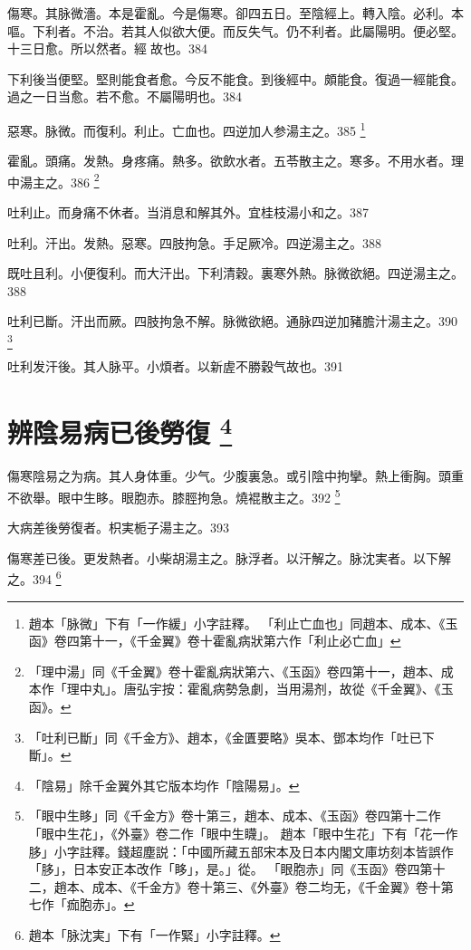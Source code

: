 傷寒。其脉微濇。本是霍亂。今是傷寒。卻四五日。至陰經上。轉入陰。必利。本嘔。下利者。不治。若其人似欲大便。而反失气。仍不利者。此屬陽明。便必堅。十三日愈。所以然者。經{\sungii 𥁞}故也。384

下利後当便堅。堅則能食者愈。今反不能食。到後經中。頗能食。復過一經能食。過之一日当愈。若不愈。不屬陽明也。384

惡寒。脉微。而復利。利止。亡血也。四逆加人参湯主之。385
	\footnote{
		趙本「脉微」下有「一作緩」小字註釋。
		「利止亡血也」同趙本、成本、《玉函》卷四第十一，《千金翼》卷十霍亂病狀第六作「利止必亡血」
	}

霍亂。頭痛。发熱。身疼痛。熱多。欲飲水者。五苓散主之。寒多。不用水者。理中湯主之。386
	\footnote{
		「理中湯」同《千金翼》卷十霍亂病狀第六、《玉函》卷四第十一，趙本、成本作「理中丸」。唐弘宇按：霍亂病勢急劇，当用湯剂，故從《千金翼》、《玉函》。
	}

吐利止。而身痛不休者。当消息和解其外。宜桂枝湯小和之。387

吐利。汗出。发熱。惡寒。四肢拘急。手足厥冷。四逆湯主之。388

既吐且利。小便復利。而大汗出。下利清穀。裏寒外熱。脉微欲絕。四逆湯主之。388

吐利已斷。汗出而厥。四肢拘急不解。脉微欲絕。通脉四逆加豬膽汁湯主之。390
	\footnote{
		「吐利已斷」同《千金方》、趙本，《金匱要略》吳本、鄧本均作「吐已下斷」。
	}

吐利发汗後。其人脉平。小煩者。以新虗不勝穀气故也。391

\chapter{辨陰易病已後勞復
	\footnote{
		「陰易」除千金翼外其它版本均作「陰陽易」。
	}
}

傷寒陰易之为病。其人身体重。少气。少腹裏急。或引陰中拘攣。熱上衝胸。頭重不欲舉。眼中生眵。{\khaai 眼胞赤。}膝脛拘急。燒裩散主之。392
	\footnote{
		「眼中生眵」同《千金方》卷十第三，趙本、成本、《玉函》卷四第十二作「眼中生花」，《外臺》卷二作「眼中生䁾」。
		趙本「眼中生花」下有「花一作䏧」小字註釋。錢超塵説：「中國所藏五部宋本及日本内閣文庫坊刻本皆誤作「䏧」，日本安正本改作「眵」，是。」從。
		「眼胞赤」同《玉函》卷四第十二，趙本、成本、《千金方》卷十第三、《外臺》卷二均无，《千金翼》卷十第七作「痂胞赤」。
	}

大病差後勞復者。枳実栀子湯主之。393

傷寒差已後。更发熱者。小柴胡湯主之。脉浮者。以汗解之。脉沈実者。以下解之。394
	\footnote{
		趙本「脉沈実」下有「一作緊」小字註釋。
	}


